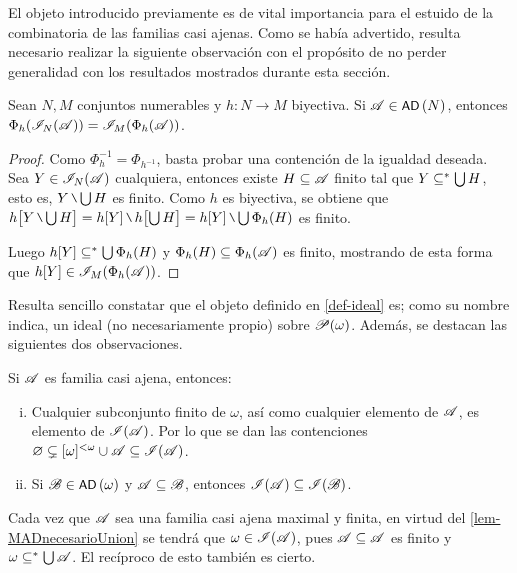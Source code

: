 	El objeto introducido previamente es de vital importancia para el estuido de la combinatoria de las familias casi ajenas. Como se había advertido, resulta necesario realizar la siguiente observación con el propósito de no perder generalidad con los resultados mostrados durante esta sección.
	
	\begin{proposicion}\label{prop-IdealBiyec}
		Sean $N,M$ conjuntos numerables y $h:N \to M$ biyectiva. Si $\mathscr{A} \in \operatorname{\text{\textsf{\small AD}}}\,(N)$, entonces $\Phi_h (\mathscr{I}_N (\mathscr{A})) = \mathscr{I}_M (\Phi_h( \mathscr{A} )) $.
	\end{proposicion}
	
	\begin{proof}
		Como $\Phi_h^{-1} = \Phi_{h^{-1}}$, basta probar una contención de la igualdad deseada. Sea $Y \in \mathscr{I}_N (\mathscr{A})$ cualquiera, entonces existe $H \subseteq \mathscr{A}$ finito tal que $Y \subseteq^* \mbox{$\bigcup$}\, H$, esto es, $Y \setminus \midcup H$ es finito. Como $h$ es biyectiva, se obtiene que $ h \big[ Y \setminus \midcup H \big] = h[Y] \setminus h\big[ \midcup H \big] = h[Y] \setminus \midcup \Phi_h(H)$ es finito.
	
		Luego $h[Y] \subseteq^* \mbox{$\bigcup$}\, \Phi_h(H) $ y $\Phi_h(H) \subseteq \Phi_h(\mathscr{A})$ es finito, mostrando de esta forma que $h[Y] \in \mathscr{I}_M (\Phi_h( \mathscr{A} ))$. 
	\end{proof}

	Resulta sencillo constatar que el objeto definido en \ref{def-ideal} es; como su nombre indica, un ideal (no necesariamente propio) sobre $\mathscr{P}(\omega)$. Además, se destacan las siguientes dos observaciones.
	
	\begin{observacion}\label{obs-IdealPrevia}
		Si $\mathscr{A}$ es familia casi ajena, entonces:
		\begin{enumerate}[i)]
			\item Cualquier subconjunto finito de $\omega$, así como cualquier elemento de $\mathscr{A}$, es elemento de $\mathscr{I}(\mathscr{A})$. Por lo que se dan las contenciones $\varnothing \subsetneq [\omega]^{<\omega} \cup \mathscr{A} \subseteq \mathscr{I}(\mathscr{A})$.
			\item Si $\mathscr{B} \in \operatorname{\text{\textsf{\small AD}}}\,(\omega)$ y $\mathscr{A} \subseteq \mathscr{B}$, entonces $\mathscr{I}(\mathscr{A}) \subseteq \mathscr{I}(\mathscr{B})$.
		\end{enumerate}
	\end{observacion}
	
	Cada vez que $\mathscr{A}$ sea una familia casi ajena maximal y finita, en virtud del \autoref{lem-MADnecesarioUnion} se tendrá que $\omega \in \mathscr{I}(\mathscr{A})$, pues $\mathscr{A} \subseteq \mathscr{A}$ es finito y $\omega \subseteq^* \mbox{$\bigcup$}\, \mathscr{A}$. El recíproco de esto también es cierto.
	
